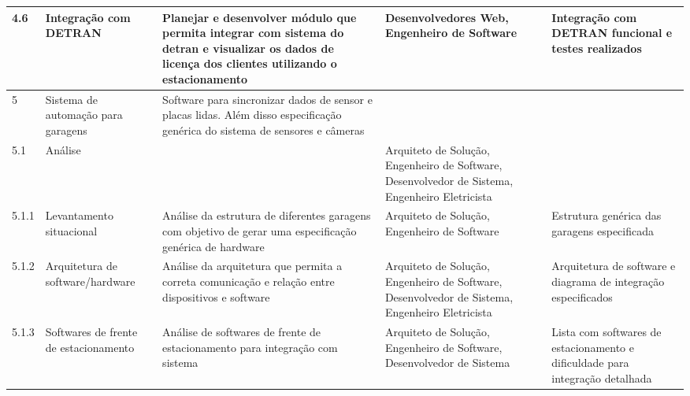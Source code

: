 \begin{longtable}{  l  p{}  p{}  p{}  p{}  }
	\midrule
	4.6         & Integração com DETRAN                                   & Planejar e desenvolver módulo que permita integrar com sistema do detran e visualizar os dados de licença dos clientes utilizando o estacionamento                             & Desenvolvedores Web, Engenheiro de Software                                                      & Integração com DETRAN funcional e testes realizados                                                    \\*
	\midrule
	5           & Sistema de automação para garagens                      & Software para sincronizar dados de sensor e placas lidas. Além disso especificação genérica do sistema de sensores e câmeras                                                &                                                                                                  &                                                                                                          \\*
	\midrule
	5.1         & Análise                                                  &                                                                                                                                                                                  & Arquiteto de Solução, Engenheiro de Software, Desenvolvedor de Sistema, Engenheiro Eletricista &                                                                                                          \\*
	\midrule
	5.1.1       & Levantamento situacional                                  & Análise da estrutura de diferentes garagens com objetivo de gerar uma especificação genérica de hardware                                                                     & Arquiteto de Solução, Engenheiro de Software                                                   & Estrutura genérica das garagens especificada                                                            \\*
	\midrule
	5.1.2       & Arquitetura de software/hardware                          & Análise da arquitetura que permita a correta comunicação e relação entre dispositivos e software                                                                            & Arquiteto de Solução, Engenheiro de Software, Desenvolvedor de Sistema, Engenheiro Eletricista & Arquitetura de software e diagrama de integração especificados                                         \\*
	\midrule
	5.1.3       & Softwares de frente de estacionamento                     & Análise de softwares de frente de estacionamento para integração com sistema                                                                                                  & Arquiteto de Solução, Engenheiro de Software, Desenvolvedor de Sistema                         & Lista com softwares de estacionamento e dificuldade para integração detalhada                          \\*

\end{longtable}
